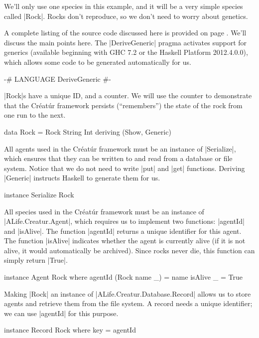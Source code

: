 We'll only use one species in this example, and it will be a very simple 
species called |Rock|.
Rocks don't reproduce, so we don't need to worry about genetics.

A complete listing of the source code discussed here is provided on 
page \pageref{code:rock}.
We'll discuss the main points here.
The |DeriveGeneric| pragma activates support for generics
(available beginning with GHC 7.2 or the Haskell Platform 2012.4.0.0),
which allows some code to be generated automatically for us.

\begin{code}
{-# LANGUAGE DeriveGeneric #-}
\end{code} 

|Rock|s have a unique ID, and a counter. 
We will use the counter to demonstrate that the Créatúr
framework persists (``remembers'') the state of the rock
from one run to the next.

\begin{code}
data Rock = Rock String Int deriving (Show, Generic)
\end{code} 

All agents used in the Créatúr framework must be an instance of
|Serialize|, which ensures that they can be written to and read from a
database or file system.
Notice that we do not need to write |put| and |get| functions.
Deriving |Generic| instructs Haskell to generate them for us.

\begin{code}
instance Serialize Rock
\end{code} 

All species used in the Créatúr framework must be an instance of 
|ALife.Creatur.Agent|,
which requires us to implement two functions: |agentId| and |isAlive|.
The function |agentId| returns a unique identifier for this agent.
The function |isAlive| indicates whether the agent is currently alive
(if it is not alive, it would automatically be archived).
Since rocks never die, this function can simply return |True|.

\begin{code}
instance Agent Rock where
  agentId (Rock name _) = name
  isAlive _ = True
\end{code} 

Making |Rock| an instance of |ALife.Creatur.Database.Record|
allows us to store agents and retrieve them from the file system.
A record needs a unique identifier;
we can use |agentId| for this purpose.

\begin{code}
instance Record Rock where key = agentId
\end{code} 

